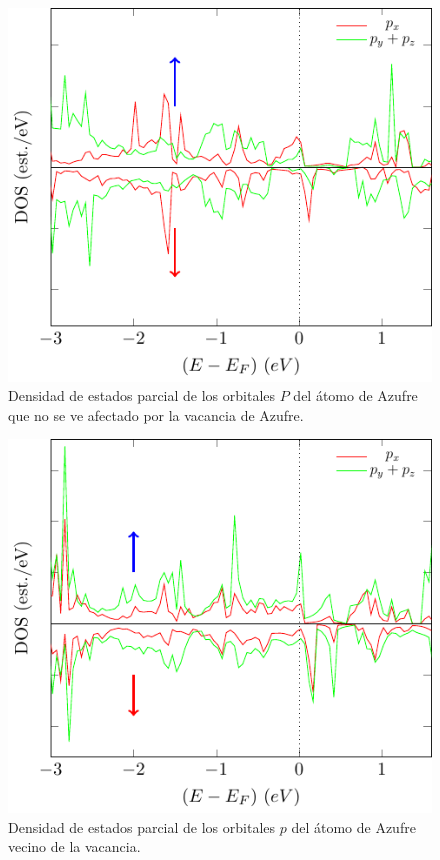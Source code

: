 \begin{figure}[!hbt]
	\centering
	\includegraphics[scale=1]{figRes/VS2/def/bandas/nosoc/pdosSe.pdf}
	\caption[Densidad de estados proyectada en los orbitales $p$ del Azufre en VS\textsubscript{2} con vacancia de Vanadio]{Densidad de estados parcial de los orbitales $P$ del \'atomo de Azufre que no se ve afectado por la vacancia de Azufre.}
	\label{Sim:fig:pdosSVS2}
\end{figure}

 
\begin{figure}[!hbt]
	\centering
	\includegraphics[scale=1]{figRes/VS2/def/bandas/nosoc/pdosSe_vac.pdf}
	\caption[Densidad de estados proyectada en los orbitales $p$ del Azufre vecino de la vacancia en VS\textsubscript{2} con vacancia de Vanadio]{Densidad de estados parcial de los orbitales $p$ del \'atomo de Azufre vecino de la vacancia.}
	\label{Sim:fig:pdosSvacVS2}
\end{figure}

